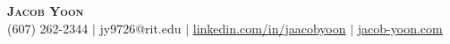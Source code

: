\begin{center}
    \textbf{\Huge \scshape Jacob Yoon} \\ \vspace{5pt}
    \small (607) 262-2344 $|$
    jy9726@rit.edu $|$
    \underline{\href{https://linkedin.com/in/jaacobyoon}{linkedin.com/in/jaacobyoon}} $|$
    \underline{\href{https://jacob-yoon.com/}{jacob-yoon.com}} \\
    \vspace{-6pt}
\end{center}
